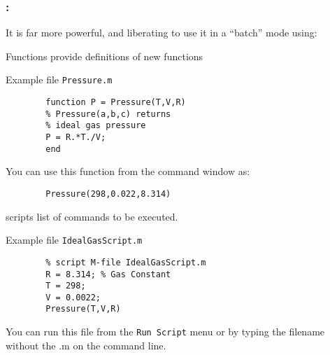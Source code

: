 \documentclass[11pt]{beamer}
\begin{document}
\begin{frame}[fragile]
	
	\frametitle{\secname : \subsecname}
    \vspace{-5pt}
	\begin{block}{}
		It is far more powerful, and liberating to use it in a ``batch'' mode using:
	\end{block}
    \vspace{-15pt}
	\begin{minipage}[t]{0.47\linewidth}
		\begin{exampleblock}{Functions}
		provide definitions of new functions
		\end{exampleblock}
		Example file \verb|Pressure.m|
		\begin{verbatim}
		function P = Pressure(T,V,R)
		% Pressure(a,b,c) returns 
		% ideal gas pressure
		P = R.*T./V; 
		end
		\end{verbatim}
		You can use this function from the command window as:
		\vspace{-10pt}		
		\begin{verbatim}
		Pressure(298,0.022,8.314)
		\end{verbatim}		
	\end{minipage}
	\hspace{10pt}
	\begin{minipage}[t]{0.47\linewidth}
		\begin{block}{scripts}
		list of commands to be executed.
		\end{block}
		Example file \verb|IdealGasScript.m|
		\begin{verbatim}
		% script M-file IdealGasScript.m
		R = 8.314; % Gas Constant
		T = 298;
		V = 0.0022;
		Pressure(T,V,R)
		\end{verbatim}
		You can run this file from the \verb|Run Script| menu or by typing the
		filename without the .m on the command line. 
	\end{minipage}
	
\end{frame}
\end{document}

